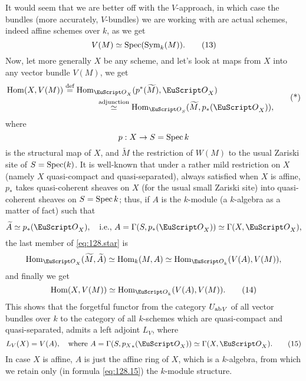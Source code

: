 It would seem that we are better off with the $V$-approach, in which
case the bundles (more accurately, $V$-bundles) we are working with
are actual schemes, indeed affine schemes over $k$, as we get
\begin{equation}
  \label{eq:128.13}
  V(M)\simeq \operatorname{Spec}(\operatorname{Sym}_k(M)).\tag{13}
\end{equation}
Now, let more generally $X$ be any scheme, and let's look at maps from
$X$ into any vector bundle $V(M)$, we get
\begin{equation}
  \label{eq:128.star}
  \begin{split}
    \Hom(X,V(M)) &\eqdef
    \Hom_{\scrO_X}(p^*(\widetilde M), \scrO_X) \\
    &\qquad\qquad\overset{\textup{adjunction}}{\simeq}
    \Hom_{\scrO_S}(\widetilde M, p_*(\scrO_X)),     
  \end{split}\tag{*} 
\end{equation}
where
\[p:X\to S=\operatorname{Spec} k\]
is the structural map of $X$, and $\widetilde M$ the restriction of
$W(M)$ to the usual Zariski site of $S=\operatorname{Spec}(k)$. It is well-known
that under a rather mild restriction on $X$ (namely $X$ quasi-compact
and quasi-separated), always satisfied when $X$ is affine, $p_*$ takes
quasi-coherent sheaves on $X$ (for the usual small Zariski site) into
quasi-coherent sheaves on $S=\operatorname{Spec} k$; thus, if $A$ is the
$k$-module (a $k$-algebra as a matter of fact) such that
\[\widetilde A\simeq p_*(\scrO_X),\quad
\text{i.e., $A=\Gamma(S,p_*(\scrO_X))\simeq\Gamma(X,\scrO_X)$,}\]
the last member of \eqref{eq:128.star} is
\[\Hom_{\scrO_X}(\widetilde M,\widetilde A) \simeq \Hom_k(M,A) \simeq
\Hom_{\scrO_k}(V(A),V(M)),\]
and finally we get
\begin{equation}
  \label{eq:128.14}
  \Hom(X,V(M)) \simeq \Hom_{\scrO_k}(V(A),V(M)).\tag{14}
\end{equation}
This shows that the forgetful functor from the category ${U_{\mathrm{ab}}}_V$
of all vector bundles over $k$ to the category of all $k$-schemes
which are quasi-compact and quasi-separated, admits a left adjoint
$L_V$, where
\begin{equation}
  \label{eq:128.15}
  L_V(X)=V(A), \quad
  \text{where $A=\Gamma(S,{p_X}_*(\scrO_X)) \simeq
    \Gamma(X,\scrO_X)$.}\tag{15} 
\end{equation}
In case $X$ is affine, $A$ is just the affine ring of $X$, which is a
$k$-algebra, from which we retain only (in formula \eqref{eq:128.15})
the $k$-module structure.

